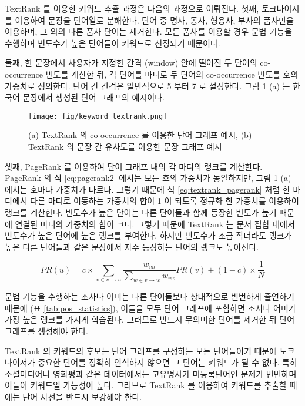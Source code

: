 \documentclass[oneside, ko,phd]{snuthesis_utf8_kor}
\begin{document}
TextRank 를 이용한 키워드 추출 과정은 다음의 과정으로 이뤄진다.
첫째, 토크나이저를 이용하여 문장을 단어열로 분해한다.
단어 중 명사, 동사, 형용사, 부사의 품사만을 이용하며, 그 외의 다른 품사 단어는 제거한다.
모든 품사를 이용할 경우 문법 기능을 수행하며 빈도수가 높은 단어들이 키워드로 선정되기 때문이다.

둘째, 한 문장에서 사용자가 지정한 간격 (window) 안에 떨어진 두 단어의 co-occurrence 빈도를 계산한 뒤, 각 단어를 마디로 두 단어의 co-occurrence 빈도를 호의 가중치로 정의한다.
단어 간 간격은 일반적으로 5 부터 7 로 설정한다.
그림 \ref{fig:textrank} (a) 는 한국어 문장에서 생성된 단어 그래프의 예시이다.

\begin{figure}[H]
\centering
\texttt{[image: fig/keyword\_textrank.png]}
\caption{(a) TextRank 의 co-occurrence 를 이용한 단어 그래프 예시, (b) TextRank 의 문장 간 유사도를 이용한 문장 그래프 예시}
\label{fig:textrank}
\end{figure}

셋째, PageRank \cite{ilprints422} 를 이용하여 단어 그래프 내의 각 마디의 랭크를 계산한다.
PageRank 의 식 \ref{eq:pagerank2} 에서는 모든 호의 가중치가 동일하지만, 그림 \ref{fig:textrank} (a) 에서는 호마다 가중치가 다르다.
그렇기 때문에 식 \ref{eq:textrank_pagerank} 처럼 한 마디에서 다른 마디로 이동하는 가중치의 합이 1 이 되도록 정규화 한 가중치를 이용하여 랭크를 계산한다.
빈도수가 높은 단어는 다른 단어들과 함께 등장한 빈도가 높기 때문에 연결된 마디의 가중치의 합이 크다.
그렇기 때문에 TextRank 는 문서 집합 내에서 빈도수가 높은 단어에 높은 랭크를 부여한다.
하지만 빈도수가 조금 작더라도 랭크가 높은 다른 단어들과 같은 문장에서 자주 등장하는 단어의 랭크도 높아진다.

\begin{equation}
\label{eq:textrank_pagerank}
PR(u) = c \times \sum_{v \in v \rightarrow u} \frac{w_{vu}}{\sum_{w \in v \rightarrow w} w_{vw}} PR(v) + (1-c) \times \frac{1}{N}
\end{equation}

문법 기능을 수행하는 조사나 어미는 다른 단어들보다 상대적으로 빈번하게 출연하기 때문에 (표 \ref{tab:pos_statistics}), 이들을 모두 단어 그래프에 포함하면 조사나 어미가 가장 높은 랭크를 가지게 학습된다.
그러므로 반드시 무의미한 단어를 제거한 뒤 단어 그래프를 생성해야 한다.

TextRank 의 키워드의 후보는 단어 그래프를 구성하는 모든 단어들이기 때문에 토크나이저가 중요한 단어를 정확히 인식하지 않으면 그 단어는 키워드가 될 수 없다.
특히 소셜미디어나 영화평과 같은 데이터에서는 고유명사가 미등록단어인 문제가 빈번하며 이들이 키워드일 가능성이 높다.
그러므로 TextRank 를 이용하여 키워드를 추출할 때에는 단어 사전을 반드시 보강해야 한다.
\end{document}
